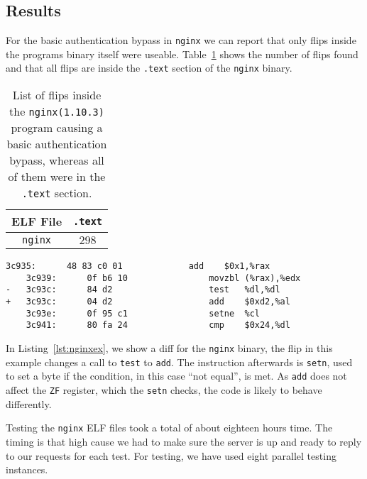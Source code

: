 \subsection{Results}

For the basic authentication bypass in \texttt{nginx} we can report that only
flips inside the program\textquotesingle s binary itself were useable.
Table~\ref{tab:nginxres} shows the number of flips found and that all flips are
inside the \texttt{.text} section of the \texttt{nginx} binary.

\begin{table}[!htb]
\centering
\begin{tabular}{c|c}
ELF File               & \texttt{.text} \\ \hline
\texttt{nginx}         & $298$
\end{tabular}
\caption{List of flips inside the \texttt{nginx(1.10.3)} program causing a
basic authentication bypass, whereas all of them were in the \texttt{.text}
section.}
\label{tab:nginxres}
\end{table}

\begin{minipage}{\linewidth}
\begin{lstlisting}[style=diff,
                   caption={Diff for a bitflip applied to the \texttt{nginx}
binary in order to bypass a credential check. The call to \texttt{test} is
replaced by \texttt{add} which doesn't chage a register the \texttt{setne}
instruction would check.},
label=lst:nginxex]
    3c935:      48 83 c0 01             add    $0x1,%rax
    3c939:      0f b6 10                movzbl (%rax),%edx
-   3c93c:      84 d2                   test   %dl,%dl
+   3c93c:      04 d2                   add    $0xd2,%al
    3c93e:      0f 95 c1                setne  %cl
    3c941:      80 fa 24                cmp    $0x24,%dl
\end{lstlisting}
\end{minipage}

In Listing~\ref{lst:nginxex}, we show a diff for the \texttt{nginx} binary, the
flip in this example changes a call to \texttt{test} to \texttt{add}. The
instruction afterwards is \texttt{setn}, used to set a byte if the condition,
in this case ``not equal'', is met. As \texttt{add}
does not affect the \texttt{ZF} register, which the \texttt{setn} checks, the
code is likely to behave differently.

Testing the \texttt{nginx} ELF files took a total of about eighteen hours time.
The timing is that high cause we had to make sure the server is up and ready to
reply to our requests for each test. For testing, we have used eight parallel
testing instances.

